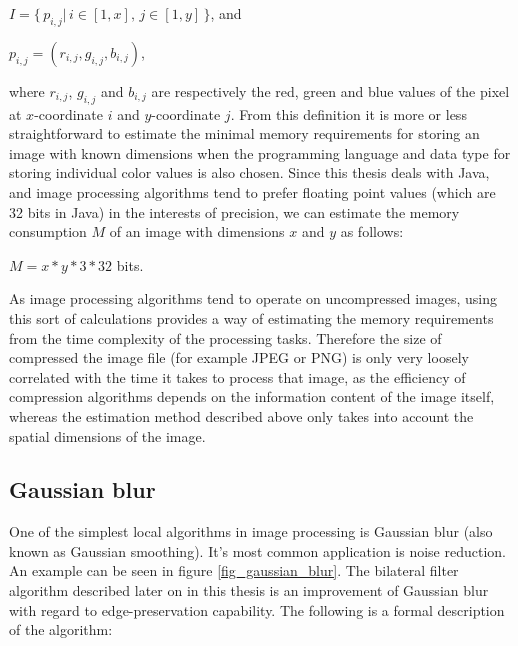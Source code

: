 \documentclass [12pt,a4paper]{report}
\begin{document}
\begin{center}
$I = \{ \, p_{i,j} | \, i \in [1,x], \, j \in [1,y] \, \}$, and

$p_{i,j} = (r_{i,j}, g_{i,j}, b_{i,j})$,
\end{center}
where $r_{i,j}$, $g_{i,j}$ and $b_{i,j}$ are respectively the red, green and blue values of the pixel at $x$-coordinate $i$ and $y$-coordinate $j$. From this definition it is more or less straightforward to estimate the minimal memory requirements for storing an image with known dimensions when the programming language and data type for storing individual color values is also chosen. Since this thesis deals with Java, and image processing algorithms tend to prefer floating point values (which are 32 bits in Java) in the interests of precision, we can estimate the memory consumption $M$ of an image with dimensions $x$ and $y$ as follows:

\begin{center} 
$M = x * y * 3 * 32$ bits.
\end{center}

As image processing algorithms tend to operate on uncompressed images, using this sort of calculations provides a way of estimating the memory requirements from the time complexity of the processing tasks. Therefore the size of compressed the image file (for example JPEG or PNG) is only very loosely correlated with the time it takes to process that image, as the efficiency of compression algorithms depends on the information content of the image itself, whereas the estimation method described above only takes into account the spatial dimensions of the image.

\subsection{Gaussian blur}

One of the simplest local algorithms in image processing is Gaussian blur (also known as Gaussian smoothing). It's most common application is noise reduction. An example can be seen in figure \ref{fig_gaussian_blur}. The bilateral filter algorithm described later on in this thesis is an improvement of Gaussian blur with regard to edge-preservation capability. The following is a formal description of the algorithm:

\begin{center}
\begin{algorithm}[h]
\end{algorithm}
\end{center}
\end{document}
